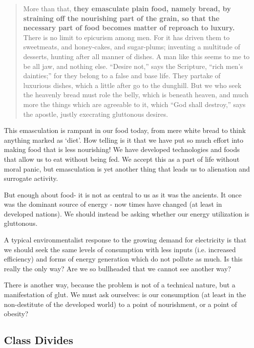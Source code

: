 \documentclass[letterpaper]{article}
\begin{document}
\begin{quote}
  More than that, \textbf{they emasculate plain food, namely bread, by straining off the nourishing part of the grain, so that the necessary part of food becomes matter of reproach to luxury.} There is no limit to epicurism among men. For it has driven them to sweetmeats, and honey-cakes, and sugar-plums; inventing a multitude of desserts, hunting after all manner of dishes. A man like this seems to me to be all jaw, and nothing else. “Desire not,” says the Scripture, “rich men’s dainties;” for they belong to a false and base life. They partake of luxurious dishes, which a little after go to the dunghill. But we who seek the heavenly bread must role the belly, which is beneath heaven, and much more the things which are agreeable to it, which “God shall destroy,” says the apostle, justly execrating gluttonous desires.
\end{quote}

This emasculation is rampant in our food today, from mere white bread to think anything marked as `diet'. How telling is it that we have put so much effort into making food that is less nourishing! We have developed technologies and foods that allow us to eat without being fed. We accept this as a part of life without moral panic, but emasculation is yet another thing that leads us to alienation and surrogate activity.

But enough about food- it is not as central to us as it was the ancients. It once was the dominant source of energy - now times have changed (at least in developed nations). We should instead be asking whether our energy utilization is gluttonous.

A typical environmentalist response to the growing demand for electricity is that we should seek the same levels of consumption with less inputs (i.e. increased efficiency) and forms of energy generation which do not pollute as much. Is this really the only way? Are we so bullheaded that we cannot see another way?

There is another way, because the problem is not of a technical nature, but a manifestation of glut. We must ask ourselves: is our consumption (at least in the non-destitute of the developed world) to a point of nourishment, or a point of obesity?


\subsection{Class Divides}
\end{document}
